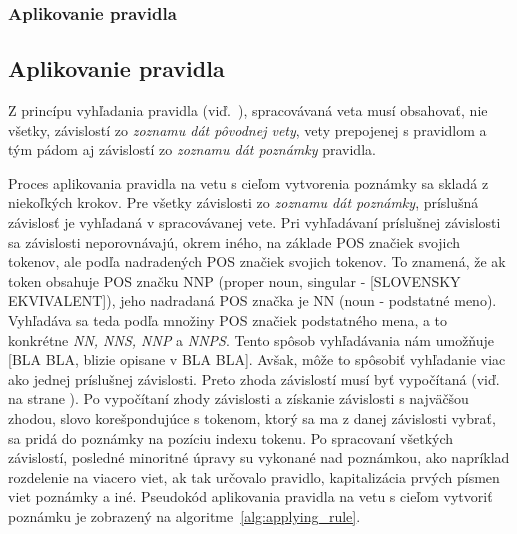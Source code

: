 %
%
{
	\subsubsection{Aplikovanie pravidla}
}
{
	\subsection{Aplikovanie pravidla}
}
\label{subsubsection:rule_application}

Z princípu vyhľadania pravidla (viď.~), spracovávaná veta musí obsahovať, nie všetky, závislostí zo \textit{zoznamu dát pôvodnej vety}, vety prepojenej s pravidlom a tým pádom aj závislostí zo \textit{zoznamu dát poznámky} pravidla.

Proces aplikovania pravidla na vetu s cieľom vytvorenia poznámky sa skladá z niekoľkých krokov. Pre všetky závislosti zo \textit{zoznamu dát poznámky}, príslušná závislosť je vyhľadaná v spracovávanej vete. Pri vyhľadávaní príslušnej závislosti sa závislosti neporovnávajú, okrem iného, na základe POS značiek svojich tokenov, ale podľa nadradených POS značiek svojich tokenov. To znamená, že ak token obsahuje POS značku NNP (proper noun, singular - [SLOVENSKY EKVIVALENT]), jeho nadradaná POS značka je NN (noun - podstatné meno). Vyhľadáva sa teda podľa množiny POS značiek podstatného mena, a to konkrétne \textit{NN, NNS, NNP} a \textit{NNPS}. Tento spôsob vyhľadávania nám umožňuje [BLA BLA, blizie opisane v BLA BLA]. Avšak, môže to spôsobiť vyhľadanie viac ako jednej príslušnej závislosti. Preto zhoda závislostí musí byť vypočítaná (viď.~ na strane \pageref{paragraph:dependency_match}). Po vypočítaní zhody závislosti a získanie závislosti s najväčšou zhodou, slovo korešpondujúce s tokenom, ktorý sa ma z danej závislosti vybrať, sa pridá do poznámky na pozíciu indexu tokenu. Po spracovaní všetkých závislostí, posledné minoritné úpravy su vykonané nad poznámkou, ako napríklad rozdelenie na viacero viet, ak tak určovalo pravidlo, kapitalizácia prvých písmen viet poznámky a iné. Pseudokód aplikovania pravidla na vetu s cieľom vytvoriť poznámku je zobrazený na algoritme~\ref{alg:applying_rule}.

